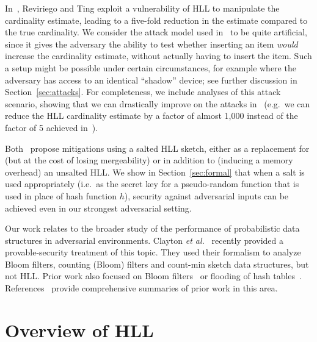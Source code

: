 \documentclass{article}
\begin{document}
In~\cite{hllvuln}, Reviriego and Ting exploit a vulnerability of HLL to manipulate the cardinality estimate, leading to a five-fold reduction in the estimate compared to the true cardinality. We consider the attack model used in~\cite{hllvuln} to be quite artificial, since it gives the adversary the ability to test whether inserting an item \emph{would} increase the cardinality estimate, without actually having to insert the item. Such a setup might be possible under certain circumstances, for example where the adversary has access to an identical ``shadow'' device; see further discussion in Section~\ref{sec:attacks}. For completeness, we include analyses of this attack scenario, showing that we can drastically improve on the attacks in~\cite{hllvuln} (e.g.\ we can reduce the HLL cardinality estimate by a factor of almost 1,000 instead of the factor of 5 achieved in~\cite{hllvuln}).

Both~\cite{cardestprivacy,hllvuln} propose mitigations using a salted HLL sketch, either as a replacement for (but at the cost of losing mergeability) or in addition to (inducing a memory overhead) an unsalted HLL. We show in Section~\ref{sec:formal} that when a salt is used appropriately (i.e.\ as the secret key for a pseudo-random function that is used in place of hash function $h$), security against adversarial inputs can be achieved even in our strongest adversarial setting. 

Our work relates to the broader study of the performance of probabilistic data structures in adversarial environments.
Clayton \emph{et al.}~\cite{CCS:ClaPatShrPS19} recently provided a provable-security treatment of this topic. They used their formalism to analyze Bloom filters, counting (Bloom) filters and count-min sketch data structures, but not HLL. Prior work also focused on Bloom filters~\cite{NaorY15,GerbetKL15} or flooding of hash tables~\cite{LiptonN93,CrosbyW03}. References~\cite{GerbetKL15,CCS:ClaPatShrPS19} provide comprehensive summaries of prior work in this area. 


\section{Overview of HLL}\label{sec:overview}
\end{document}
